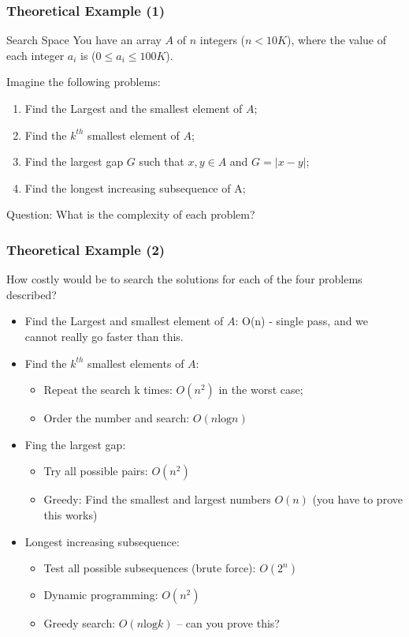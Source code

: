 \documentclass{beamer}
\begin{document}
\begin{frame}
  \frametitle{Theoretical Example (1)}

  \begin{block}{Search Space}
    You have an array $A$ of $n$ integers ($n < 10K$), where the value
    of each integer $a_i$ is ($0 \leq a_i \leq 100K$).
  \end{block}
  
  \bigskip

  Imagine the following problems:
  \begin{enumerate}
  \item Find the Largest and the smallest element of $A$;
  \item Find the $k^{th}$ smallest element of $A$;
  \item Find the largest gap $G$ such that $x,y \in A$ and $G = |x-y|$;
  \item Find the longest increasing subsequence of A;
  \end{enumerate}

  \bigskip

  \alert{Question:} What is the complexity of each problem?
\end{frame}

\begin{frame}
  \frametitle{Theoretical Example (2)} 

  {\smaller
  How costly would be to search the solutions for each of the four
  problems described?

  \bigskip
  
  \begin{itemize}
  \item Find the Largest and smallest element of $A$: O(n) - single
    pass, and we cannot really go faster than this.
  \item Find the $k^{th}$ smallest elements of $A$:
    \begin{itemize}
    \item Repeat the search k times: $O(n^2)$ in the worst case;
    \item Order the number and search: $O(n\text{log}n)$
    \end{itemize}
  \item Fing the largest gap:
    \begin{itemize}
    \item Try all possible pairs: $O(n^2)$
    \item Greedy: Find the smallest and largest numbers $O(n)$ (you
      have to prove this works)
    \end{itemize}
  \item Longest increasing subsequence:
    \begin{itemize}
    \item Test all possible subsequences (brute force): $O(2^n)$
    \item Dynamic programming: $O(n^2)$
    \item Greedy search: $O(n\text{log}k)$ -- can you prove this?
    \end{itemize}
  \end{itemize}  
  }
\end{frame}
\end{document}
